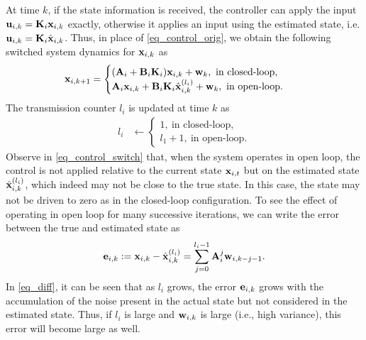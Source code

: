 At time $k$, if the state information is received, the controller can apply the input ${\mathbf u}_{i,k} = {\mathbf K}_i {\mathbf x}_{i,k}$ exactly, otherwise it applies an input using the estimated state, i.e. ${\mathbf u}_{i,k} = {\mathbf K}_i {\hat{\mathbf x} }_{i,k}$. Thus, in place of \eqref{eq_control_orig}, we obtain the following switched system dynamics for ${\mathbf x}_{i,k}$ as
%
\begin{align}\label{eq_control_switch}
\bbx_{i,k+1} &= \begin{cases}
(\bbA_i + \bbB_i \bbK_i) \bbx_{i,k} + \bbw_k, \ \text{in closed-loop}, \\
\bbA_i \bbx_{i,k} + \bbB_i\bbK_i\hbx^{(l_i)}_{i,k} + \bbw_k, \ \text{in open-loop}.
\end{cases}
\end{align}
%
The transmission counter $l_i$ is updated at time $k$ as
%
\begin{align}
l_i &\leftarrow \begin{cases}
1, \ \text{in closed-loop}, \\
l_1 + 1, \ \text{in open-loop}.
\end{cases} \label{eq_time_switch}
\end{align}
%
Observe in \eqref{eq_control_switch} that, when the system operates in open loop, the control is not applied relative to the current state ${\mathbf x}_{i,t}$ but on the estimated state ${\hat{\mathbf x} }^{(l_i)}_{i,k}$, which indeed may not be close to the true state. In this case, the state may not be driven to zero as in the closed-loop configuration. To see the effect of operating in open loop for many successive iterations, we can write the error between the true and estimated state as
%
\begin{align}\label{eq_diff}
\bbe_{i,k} := \bbx_{i,k} - \hbx^{(l_i)}_{i,k} = \sum_{j=0}^{l_i-1}\bbA_i^{j} \bbw_{i,k-j-1}.
\end{align}
%
In \eqref{eq_diff}, it can be seen that as $l_i$ grows, the error ${\mathbf e}_{i,k}$ grows with the accumulation of the noise present in the actual state but not considered in the estimated state. Thus, if $l_i$ is large and ${\mathbf w}_{i,k}$ is large (i.e., high variance), this error will become large as well.

